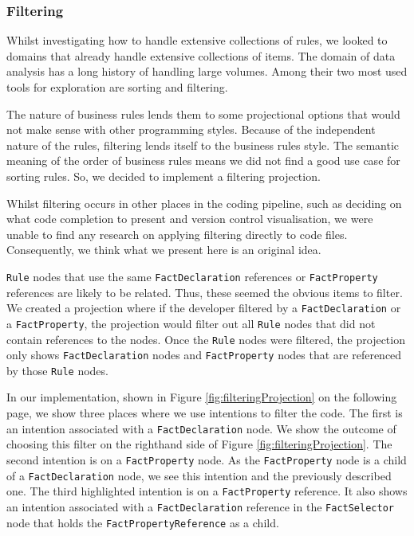 \subsubsection{Filtering}
Whilst investigating how to handle extensive collections of rules, we looked to domains that already handle extensive collections of items.
The domain of data analysis has a long history of handling large volumes.
Among their two most used tools for exploration are sorting and filtering.

The nature of business rules lends them to some projectional options that would not make sense with other programming styles.
Because of the independent nature of the rules, filtering lends itself to the business rules style.
The semantic meaning of the order of business rules means we did not find a good use case for sorting rules.
So, we decided to implement a filtering projection.

Whilst filtering occurs in other places in the coding pipeline, such as deciding on what code completion to present\cite{hou2010towards} and version control visualisation\cite{yoon2013visualization}, we were unable to find any research on applying filtering directly to code files.
Consequently, we think what we present here is an original idea.

\texttt{Rule} nodes that use the same \texttt{FactDeclaration} references or \texttt{FactProperty} references are likely to be related.
Thus, these seemed the obvious items to filter.
We created a projection where if the developer filtered by a \texttt{FactDeclaration} or a \texttt{FactProperty}, the projection would filter out all \texttt{Rule} nodes that did not contain references to the nodes.
Once the \texttt{Rule} nodes were filtered, the projection only shows \texttt{FactDeclaration} nodes and \texttt{FactProperty} nodes that are referenced by those \texttt{Rule} nodes.

In our implementation, shown in Figure \ref{fig:filteringProjection} on the following page, we show three places where we use intentions to filter the code.
The first is an intention associated with a \texttt{FactDeclaration} node.
We show the outcome of choosing this filter on the righthand side of Figure \ref{fig:filteringProjection}.
The second intention is on a \texttt{FactProperty} node.
As the \texttt{FactProperty} node is a child of a \texttt{FactDeclaration} node, we see this intention and the previously described one.
The third highlighted intention is on a \texttt{FactProperty} reference.
It also shows an intention associated with a \texttt{FactDeclaration} reference in the \texttt{FactSelector} node that holds the \texttt{FactPropertyReference} as a child.

